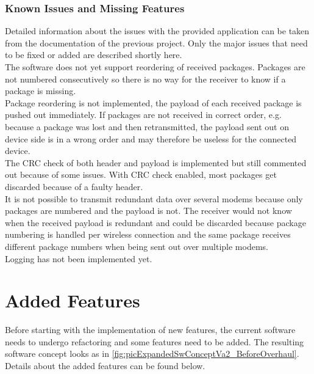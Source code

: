 \subsubsection{Known Issues and Missing Features}
Detailed information about the issues with the provided application can be taken from the documentation of the previous project. Only the major issues that need to be fixed or added are described shortly here.\\
The software does not yet support reordering of received packages. Packages are not numbered consecutively so there is no way for the receiver to know if a package is missing.\\
Package reordering is not implemented, the payload of each received package is pushed out immediately. If packages are not received in correct order, e.g. because a package was lost and then retransmitted, the payload sent out on device side is in a wrong order and may therefore be useless for the connected device.\\
The CRC check of both header and payload is implemented but still commented out because of some issues. With CRC check enabled, most packages get discarded because of a faulty header.\\
It is not possible to transmit redundant data over several modems because only packages are numbered and the payload is not. The receiver would not know when the received payload is redundant and could be discarded because package numbering is handled per wireless connection and the same package receives different package numbers when being sent out over multiple modems.\\
Logging has not been implemented yet.
%
\section{Added Features} \label{sec:txtAddedFeatures}
Before starting with the implementation of new features, the current software needs to undergo refactoring and some features need to be added. The resulting software concept looks as in \autoref{fig:picExpandedSwConceptVa2_BeforeOverhaul}. Details about the added features can be found below.
%
